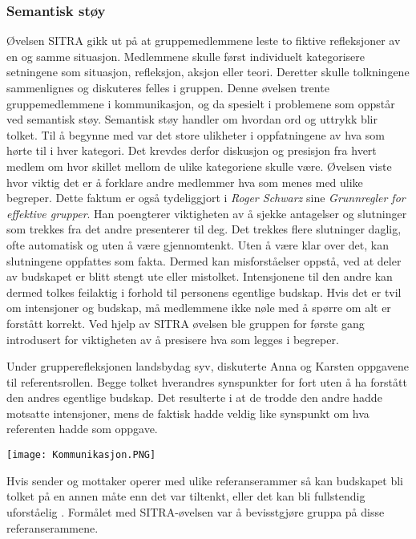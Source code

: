\subsubsection{Semantisk støy}

Øvelsen SITRA gikk ut på at gruppemedlemmene leste to fiktive refleksjoner av en og samme situasjon.
Medlemmene skulle først individuelt kategorisere setningene som situasjon, refleksjon, aksjon eller teori.
Deretter skulle tolkningene sammenlignes og diskuteres felles i gruppen.
Denne øvelsen trente gruppemedlemmene i kommunikasjon, og da spesielt i problemene som oppstår ved semantisk støy.
Semantisk støy handler om hvordan ord og uttrykk blir tolket.
Til å begynne med var det store ulikheter i oppfatningene av hva som hørte til i hver kategori.
Det krevdes derfor diskusjon og presisjon fra hvert medlem om hvor skillet mellom de ulike kategoriene skulle være.
Øvelsen viste hvor viktig det er å forklare andre medlemmer hva som menes med ulike begreper. 
Dette faktum er også tydeliggjort i \textit{Roger Schwarz} sine \textit{Grunnregler for effektive grupper}\cite{schwarz}. 
Han poengterer viktigheten av å sjekke antagelser og slutninger som trekkes fra det andre presenterer til deg. 
Det trekkes flere slutninger daglig, ofte automatisk og uten å være gjennomtenkt. 
Uten å være klar over det, kan slutningene oppfattes som fakta.
Dermed kan misforståelser oppstå, ved at deler av budskapet er blitt stengt ute eller mistolket. Intensjonene til den andre kan dermed tolkes feilaktig i forhold til personens egentlige budskap.
Hvis det er tvil om intensjoner og budskap, må medlemmene ikke nøle med å spørre om alt er forstått korrekt. Ved hjelp av SITRA øvelsen ble gruppen for første gang introdusert for viktigheten av å presisere hva som legges i begreper. 

Under grupperefleksjonen landsbydag syv, diskuterte Anna og Karsten oppgavene til referentsrollen. Begge tolket hverandres synspunkter for fort uten å ha forstått den andres egentlige budskap. Det resulterte i at de trodde den andre hadde motsatte intensjoner, mens de faktisk hadde veldig like synspunkt om hva referenten hadde som oppgave. 

\begin{center}
	\texttt{[image: Kommunikasjon.PNG]}
\end{center}


Hvis sender og mottaker operer med ulike referanserammer så kan budskapet bli tolket på en annen måte enn det var tiltenkt, eller det kan bli fullstendig uforståelig \cite{prosjekteringsledelse}.
Formålet med SITRA-øvelsen var å bevisstgjøre gruppa på disse referanserammene.

